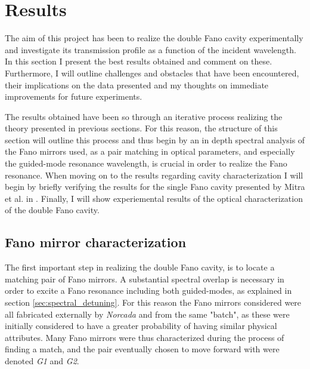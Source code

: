 \section{Results}

The aim of this project has been to realize the double Fano cavity experimentally and investigate its transmission profile as a function of the incident wavelength. In this section I present the best results obtained and comment on these. Furthermore, I will outline challenges and obstacles that have been encountered, their implications on the data presented and my thoughts on immediate improvements for future experiments. 

The results obtained have been so through an iterative process realizing the theory presented in previous sections. For this reason, the structure of this section will outline this process and thus begin by an in depth spectral analysis of the Fano mirrors used, as a pair matching in optical parameters, and especially the guided-mode resonance wavelength, is crucial in order to realize the Fano resonance. When moving on to the results regarding cavity characterization I will begin by briefly verifying the results for the single Fano cavity presented by Mitra et al. in \cite{Mitra}. Finally, I will show experiemental results of the optical characterization of the double Fano cavity. 

\subsection{Fano mirror characterization}\label{sec:results_fano_mirror_characterization}

The first important step in realizing the double Fano cavity, is to locate a matching pair of Fano mirrors. A substantial spectral overlap is necessary in order to excite a Fano resonance including both guided-modes, as explained in section \ref{sec:spectral_detuning}. For this reason the Fano mirrors considered were all fabricated externally by \emph{Norcada} and from the same "batch", as these were initially considered to have a greater probability of having similar physical attributes. Many Fano mirrors were thus characterized during the process of finding a match, and the pair eventually chosen to move forward with were denoted \emph{G1} and \emph{G2}. 


